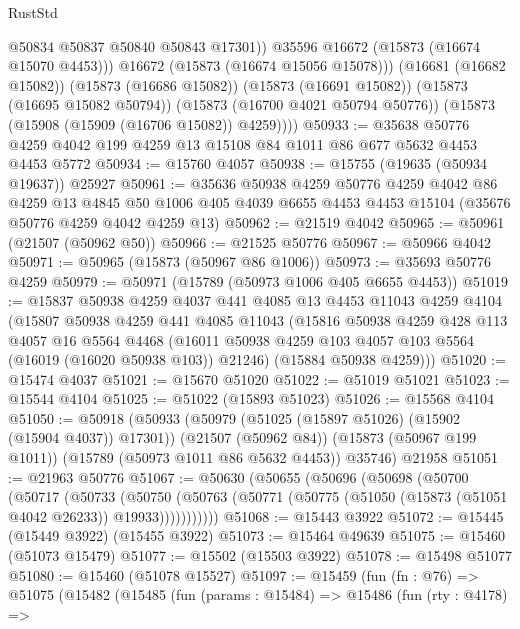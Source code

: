 \begin{lexlean}{RustStd}
\begin{coremodule}
                @50834
                @50837
                @50840
                @50843
                @17301))
            @35596
            @16672
            (@15873 (@16674 @15070 @4453)))
          @16672
          (@15873 (@16674 @15056 @15078)))
        (@16681 (@16682 @15082))
        (@15873 (@16686 @15082))
        (@15873 (@16691 @15082))
        (@15873 (@16695 @15082 @50794))
        (@15873 (@16700 @4021 @50794 @50776))
        (@15873 (@15908 (@15909 (@16706 @15082)) @4259))))
@50933 := @35638 @50776 @4259 @4042 @199 @4259 @13 @15108 @84 @1011 @86 @677 @5632 @4453 @4453 @5772
@50934 := @15760 @4057
@50938 := @15755 (@19635 (@50934 @19637)) @25927
@50961 := @35636
    @50938
    @4259
    @50776
    @4259
    @4042
    @86
    @4259
    @13
    @4845
    @50
    @1006
    @405
    @4039
    @6655
    @4453
    @4453
    @15104
    (@35676 @50776 @4259 @4042 @4259 @13)
@50962 := @21519 @4042
@50965 := @50961 (@21507 (@50962 @50))
@50966 := @21525 @50776
@50967 := @50966 @4042
@50971 := @50965 (@15873 (@50967 @86 @1006))
@50973 := @35693 @50776 @4259
@50979 := @50971 (@15789 (@50973 @1006 @405 @6655 @4453))
@51019 := @15837
    @50938
    @4259
    @4037
    @441
    @4085
    @13
    @4453
    @11043
    @4259
    @4104
    (@15807
      @50938
      @4259
      @441
      @4085
      @11043
      (@15816
        @50938
        @4259
        @428
        @113
        @4057
        @16
        @5564
        @4468
        (@16011 @50938 @4259 @103 @4057 @103 @5564 (@16019 (@16020 @50938 @103)) @21246)
        (@15884 @50938 @4259)))
@51020 := @15474 @4037
@51021 := @15670 @51020
@51022 := @51019 @51021
@51023 := @15544 @4104
@51025 := @51022 (@15893 @51023)
@51026 := @15568 @4104
@51050 := @50918
    (@50933
      (@50979 (@51025 (@15897 @51026) (@15902 (@15904 @4037)) @17301))
      (@21507 (@50962 @84))
      (@15873 (@50967 @199 @1011))
      (@15789 (@50973 @1011 @86 @5632 @4453))
      @35746)
    @21958
@51051 := @21963 @50776
@51067 := @50630
    (@50655
      (@50696
        (@50698
          (@50700
            (@50717
              (@50733
                (@50750
                  (@50763 (@50771 (@50775 (@51050 (@15873 (@51051 @4042 @26233)) @19933)))))))))))
@51068 := @15443 @3922
@51072 := @15445 (@15449 @3922) (@15455 @3922)
@51073 := @15464 @49639
@51075 := @15460 (@51073 @15479)
@51077 := @15502 (@15503 @3922)
@51078 := @15498 @51077
@51080 := @15460 (@51078 @15527)
@51097 := @15459
    (fun (fn : @76) =>
    @51075
      (@15482
        (@15485
          (fun (params : @15484) =>
          @15486
            (fun (rty : @4178) =>

\end{coremodule}
\end{lexlean}
